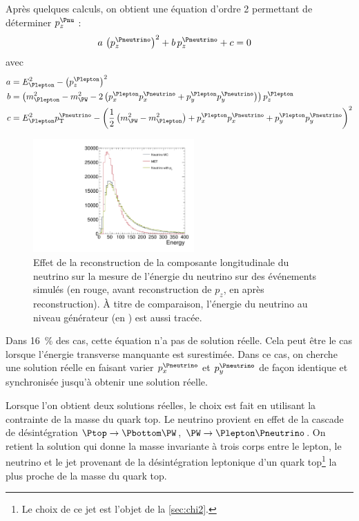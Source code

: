 Après quelques calculs, on obtient une équation d'ordre 2 permettant de déterminer $p_z^{\Pnu}$ :
\begin{align*}
  a \, \left( p_z^{{\Pneutrino}} \right)^2 + b \, p_z^{{\Pneutrino}} + c &= 0
\end{align*}
avec
\begin{align*}
  a &= E_{\Plepton}^2 - \left( p_z^{{\Plepton}} \right)^2 \\
  b &= \left( m_{\Plepton}^2 - m_{\PW}^2 - 2 \left( p_x^{\Plepton} p_x^{\Pneutrino} + p_y^{\Plepton} p_y^{\Pneutrino} \right) \right) p_z^{\Plepton} \\
  c &= E_{\Plepton}^2  \pt^{\Pneutrino} - \left( \frac{1}{2} \left( m_{\PW}^2 - m_{\Plepton}^2 \right) + p_x^{\Plepton} p_x^{\Pneutrino} + p_y^{\Plepton} p_y^{\Pneutrino} \right)^2
\end{align*}

\begin{figure}[tbp]
    \centering
    \includegraphics[width=0.55\textwidth,origin=c,angle=-90]{chapitre6/figs/plot_met_energy.pdf}
    \caption{Effet de la reconstruction de la composante longitudinale du neutrino sur la mesure de l'énergie du neutrino sur des événements \ttbar simulés (en \textcolor{rouge_grandmere}{rouge}, avant reconstruction de $p_z$, en \vertc après reconstruction). À titre de comparaison, l'énergie du neutrino au niveau générateur (en \gris) est aussi tracée.}
    \label{fig:neutrino_correction}
\end{figure}

Dans \tilde\SI{16}{\%} des cas, cette équation n'a pas de solution réelle. Cela peut être le cas lorsque l'énergie transverse manquante est surestimée. Dans ce cas, on cherche une solution réelle en faisant varier $p_x^{\Pneutrino}$ et $p_y^{\Pneutrino}$ de façon identique et synchronisée jusqu'à obtenir une solution réelle.

Lorsque l'on obtient deux solutions réelles, le choix est fait en utilisant la contrainte de la masse du quark top. Le neutrino provient en effet de la cascade de désintégration $\Ptop \rightarrow \Pbottom \PW$, $\PW \rightarrow \Plepton \Pneutrino$. On retient la solution qui donne la masse invariante à trois corps entre le lepton, le neutrino et le jet \Pbottom provenant de la désintégration leptonique d'un quark top\footnote{Le choix de ce jet est l'objet de la \cref{sec:chi2}.} la plus proche de la masse du quark top.

